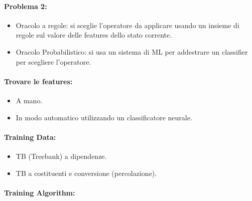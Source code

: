 \paragraph{Problema 2:}

\begin{itemize}
  \item Oracolo a regole: si sceglie l'operatore da applicare usando un insieme di regole sul valore delle features dello stato corrente. 
  \item Oracolo Probabilistico: si usa un sistema di ML per addestrare un classifier per scegliere l'operatore.
\end{itemize}


\paragraph{Trovare le features:}

\begin{itemize}
  \item A mano. 
  \item In modo automatico utilizzando un classificatore neurale.
\end{itemize}

\paragraph{Training Data:}

\begin{itemize}
  \item TB (Treebank) a dipendenze. 
  \item TB a costituenti e conversione (percolazione).
\end{itemize}

\paragraph{Training Algorithm:}

